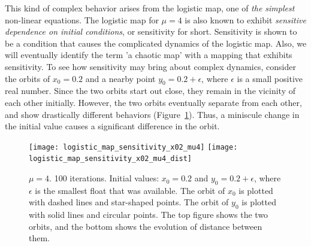 \documentclass[12pt,twoside]{book}
\begin{document}
This kind of complex behavior arises from the logistic map, one of \textit{the simplest} non-linear equations.
The logistic map for $\mu = 4$ is also known to exhibit \textit{sensitive dependence on initial conditions}, or sensitivity for short.
Sensitivity is shown to be a condition that causes the complicated dynamics of the logistic map.
Also, we will eventually identify the term 'a chaotic map' with a mapping that exhibits sensitivity.
To see how sensitivity may bring about complex dynamics, consider the orbits of $x_0 = 0.2$ and a nearby point $y_0 = 0.2 + \epsilon$, where $\epsilon$ is a small positive real number.
Since the two orbits start out close, they remain in the vicinity of each other initially.
However, the two orbits eventually separate from each other, and show drastically different behaviors (Figure~\ref{fig:logistic_sensitivity}).
Thus, a miniscule change in the initial value causes a significant difference in the orbit.
\begin{figure}[p]
  \centering
  \texttt{[image: logistic\_map\_sensitivity\_x02\_mu4]}
  \texttt{[image: logistic\_map\_sensitivity\_x02\_mu4\_dist]}
  \caption{
    $\mu = 4$. 100 iterations.
    Initial values: $x_0 = 0.2$ and $y_0 = 0.2 + \epsilon$, where $\epsilon$ is the smallest float that was available.
    The orbit of $x_0$ is plotted with dashed lines and star-shaped points.
    The orbit of $y_0$ is plotted with solid lines and circular points.
    The top figure shows the two orbits, and the bottom shows the evolution of distance between them.
  }
  \label{fig:logistic_sensitivity}
\end{figure}

\end{document}
